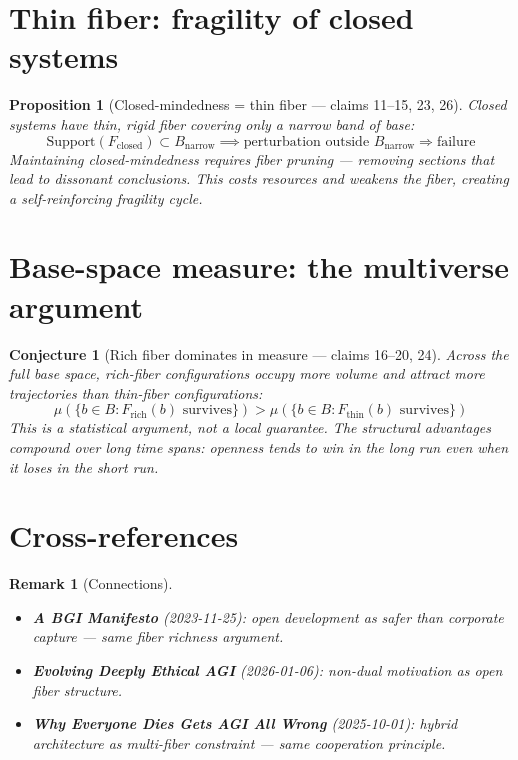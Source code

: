 \documentclass[11pt,a4paper]{article}
\newtheorem{proposition}[definition]{Proposition}
\newtheorem{remark}[definition]{Remark}
\newtheorem{conjecture}[definition]{Conjecture}
\begin{document}
\section{Thin fiber: fragility of closed systems}

\begin{proposition}[Closed-mindedness = thin fiber --- claims 11--15, 23, 26]
Closed systems have thin, rigid fiber covering only a narrow band of base:
\[
  \text{Support}(F_{\text{closed}}) \subset B_{\text{narrow}}
  \implies \text{perturbation outside } B_{\text{narrow}} \Rightarrow \text{failure}
\]
Maintaining closed-mindedness requires fiber pruning --- removing sections
that lead to dissonant conclusions. This costs resources and weakens the
fiber, creating a self-reinforcing fragility cycle.
\end{proposition}

\section{Base-space measure: the multiverse argument}

\begin{conjecture}[Rich fiber dominates in measure --- claims 16--20, 24]
Across the full base space, rich-fiber configurations occupy more volume
and attract more trajectories than thin-fiber configurations:
\[
  \mu(\{b \in B : F_{\text{rich}}(b) \text{ survives}\})
  > \mu(\{b \in B : F_{\text{thin}}(b) \text{ survives}\})
\]
This is a statistical argument, not a local guarantee. The structural
advantages compound over long time spans: openness tends to win in
the long run even when it loses in the short run.
\end{conjecture}

\section{Cross-references}

\begin{remark}[Connections]
\begin{itemize}
\item \textbf{A BGI Manifesto} (2023-11-25): open development as safer
  than corporate capture --- same fiber richness argument.
\item \textbf{Evolving Deeply Ethical AGI} (2026-01-06): non-dual
  motivation as open fiber structure.
\item \textbf{Why Everyone Dies Gets AGI All Wrong} (2025-10-01):
  hybrid architecture as multi-fiber constraint --- same cooperation
  principle.
\end{itemize}
\end{remark}
\end{document}
